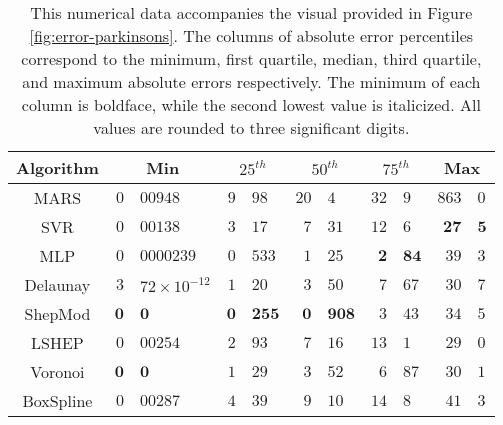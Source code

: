 \documentclass[doublespace,nopageskip]{VTthesis} %
\begin{document}
\begin{appendices}
  \begin{table}
    \centering
    \begin{tabular}{c|r@{.}l|r@{.}l|r@{.}l|r@{.}l|r@{.}l}
      \hline
      Algorithm & \multicolumn{2}{c|}{Min} & \multicolumn{2}{c|}{$25^{th}$} & \multicolumn{2}{c|}{$50^{th}$} & \multicolumn{2}{c|}{$75^{th}$} & \multicolumn{2}{c}{Max}\\
      \hline
      MARS & $0$&$00948$ & $9$&$98$ & $20$&$4$ & $32$&$9$ & $863$&$0$\\
      SVR & $0$&$00138$ & $3$&$17$ & $7$&$31$ & $12$&$6$ & $\mathbf{27}$&$\mathbf{5}$\\
      MLP & $0$&$0000239$ & $\mathit{0}$&$\mathit{533}$ & $\mathit{1}$&$\mathit{25}$ & $\mathbf{2}$&$\mathbf{84}$ & $39$&$3$\\
      Delaunay & $\mathit{3}$&$\mathit{72 \times 10^{-12}}$ & $1$&$20$ & $3$&$50$ & $7$&$67$ & $30$&$7$\\
      ShepMod & $\mathbf{0}$&$\mathbf{0}$ & $\mathbf{0}$&$\mathbf{255}$ & $\mathbf{0}$&$\mathbf{908}$ & $\mathit{3}$&$\mathit{43}$ & $34$&$5$\\
      LSHEP & $0$&$00254$ & $2$&$93$ & $7$&$16$ & $13$&$1$ & $\mathit{29}$&$\mathit{0}$\\
      Voronoi & $\mathbf{0}$&$\mathbf{0}$ & $1$&$29$ & $3$&$52$ & $6$&$87$ & $30$&$1$\\
      BoxSpline & $0$&$00287$ & $4$&$39$ & $9$&$10$ & $14$&$8$ & $41$&$3$\\
      \hline
    \end{tabular}
    \caption{This numerical data accompanies the visual provided in
      Figure \ref{fig:error-parkinsons}. The columns of absolute error
      percentiles correspond to the minimum, first quartile, median,
      third quartile, and maximum absolute errors respectively. The
      minimum of each column is boldface, while the second lowest value
      is italicized. All values are rounded to three significant
      digits.}
    \label{table:error-parkinsons}
  \end{table}


\end{appendices}
\end{document}
